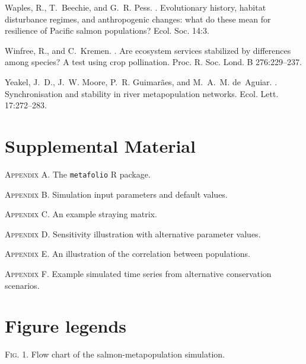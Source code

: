 \documentclass[12pt,english]{article}
\begin{document}
\begin{spacing}{1.9}
\begin{thebibliography}{64}
Waples, R., T.~Beechie, and G.~R. Pess.
.
\newblock Evolutionary history, habitat disturbance regimes, and anthropogenic
  changes: what do these mean for resilience of {Pacific} salmon populations?
\newblock Ecol. Soc. 14:3.

Winfree, R., and C.~Kremen.
.
\newblock Are ecosystem services stabilized by differences among species? {A}
  test using crop pollination.
\newblock Proc. R. Soc. Lond. B 276:229--237.

Yeakel, J.~D., J.~W. Moore, P.~R. Guimar{\~a}es, and M.~A.~M. de~Aguiar.
.
\newblock Synchronisation and stability in river metapopulation networks.
\newblock Ecol. Lett. 17:272--283.

\end{thebibliography}

\clearpage

\section{Supplemental Material}

\noindent
\textsc{Appendix A.} The \texttt{metafolio} \textsf{R} package.

\noindent
\textsc{Appendix B.} Simulation input parameters and default values.

\noindent
\textsc{Appendix C.} An example straying matrix.

\noindent
\textsc{Appendix D.} Sensitivity illustration with alternative parameter values.

\noindent
\textsc{Appendix E.} An illustration of the correlation between populations.

\noindent
\textsc{Appendix F.} Example simulated time series from alternative conservation scenarios.

\clearpage

\section{Figure legends}

\textsc{Fig. 1}. Flow chart of the salmon-metapopulation simulation.



\end{spacing}
\end{document}
